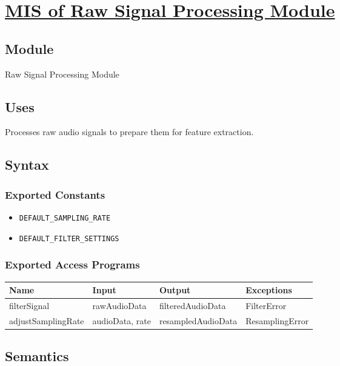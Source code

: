 \documentclass[12pt, titlepage]{article}
\begin{document}
\section{\hyperref[mRSM]{MIS of Raw Signal Processing Module}} \label{M4}  

\subsection{Module}  
Raw Signal Processing Module  

\subsection{Uses}  
Processes raw audio signals to prepare them for feature extraction.  

\subsection{Syntax}  

\subsubsection{Exported Constants}  
\begin{itemize}
    \item \texttt{DEFAULT\_SAMPLING\_RATE}  
    \item \texttt{DEFAULT\_FILTER\_SETTINGS}  
\end{itemize}  

\subsubsection{Exported Access Programs}  
\begin{center}  
\begin{tabular}{|p{4cm}|p{3cm}|p{4cm}|p{3cm}|}  
\hline  
\textbf{Name} & \textbf{Input} & \textbf{Output} & \textbf{Exceptions} \\  
\hline  
filterSignal & rawAudioData & filteredAudioData & FilterError \\  
adjustSamplingRate & audioData, rate & resampledAudioData & ResamplingError \\  
\hline  
\end{tabular}  
\end{center}  

\subsection{Semantics}  
\end{document}
